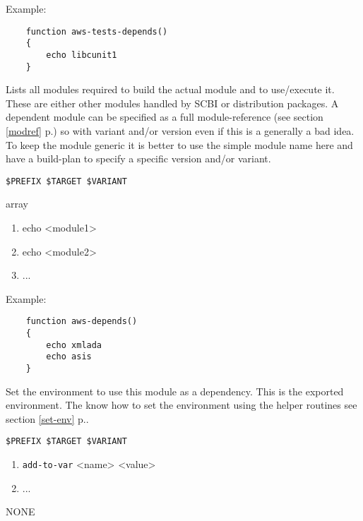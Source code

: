 \documentclass[a4paper,12pt,twoside]{article}
\newcommand{\code}[1]{\texttt{#1}}
\newcommand{\seeref}[1]{see section \ref{#1} p.\pageref{#1}}
\begin{document}
\begin{description}[font=\large\texttt]
	Example:
	\begin{lstlisting}
	function aws-tests-depends()
	{
		echo libcunit1
	}
	\end{lstlisting}

	\item[<module>{[}-common|<variant>{]}-depends] Lists all modules required to build the actual module and to use/execute it. These are either other modules handled by SCBI or distribution packages. A dependent module can be specified as a full module-reference (\seeref{modref}) so with variant and/or version even if this is a generally a bad idea. To keep the module generic it is better to use the simple module name here and have a build-plan to specify a specific version and/or variant.

	\begin{description}[font=\textit,style=standard]
		\item[parameter] \tabto{2cm} \code{\$PREFIX \$TARGET \$VARIANT}
		\item[return] \tabto{2cm} array
		\begin{enumerate}
			\item echo <module1>
			\item echo <module2>
			\item ...
		\end{enumerate}
	\end{description}

	Example:
	\begin{lstlisting}
	function aws-depends()
	{
		echo xmlada
		echo asis
	}
	\end{lstlisting}

	\item[<module>{[}-common|<variant>{]}-env] Set the environment to use this module as a dependency. This is the exported environment. The know how to set the environment using the helper routines \seeref{set-env}.
	\begin{description}[font=\textit,style=standard]
		\item[parameter] \tabto{2cm} \code{\$PREFIX \$TARGET \$VARIANT}
		\begin{enumerate}
			\item \code{add-to-var} <name> <value>
			\item ...
		\end{enumerate}
		\item[return] \tabto{2cm} NONE
	\end{description}


\end{description}
\end{document}
